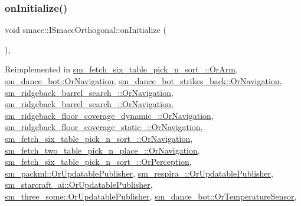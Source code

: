\subsubsection{\texorpdfstring{on\+Initialize()}{onInitialize()}}
{\footnotesize\ttfamily void smacc\+::\+I\+Smacc\+Orthogonal\+::on\+Initialize (\begin{DoxyParamCaption}{ }\end{DoxyParamCaption})\hspace{0.3cm}{\ttfamily [protected]}, {\ttfamily [virtual]}}



Reimplemented in \hyperlink{classsm__fetch__six__table__pick__n__sort__1_1_1OrArm_a0cce02f6b7599e602310347cad5c3729}{sm\+\_\+fetch\+\_\+six\+\_\+table\+\_\+pick\+\_\+n\+\_\+sort\+\_\+::\+Or\+Arm}, \hyperlink{classsm__dance__bot_1_1OrNavigation_a9f87c78f5af67024c9eda25097a135ac}{sm\+\_\+dance\+\_\+bot\+::\+Or\+Navigation}, \hyperlink{classsm__dance__bot__strikes__back_1_1OrNavigation_a458a0c5fed04b9906c6943f1e7ac5bf0}{sm\+\_\+dance\+\_\+bot\+\_\+strikes\+\_\+back\+::\+Or\+Navigation}, \hyperlink{classsm__ridgeback__barrel__search__1_1_1OrNavigation_ac144dc365f1d7708dfeace36b8734885}{sm\+\_\+ridgeback\+\_\+barrel\+\_\+search\+\_\+::\+Or\+Navigation}, \hyperlink{classsm__ridgeback__barrel__search__2_1_1OrNavigation_aee279dd334bda539b0a2b614ec32b95f}{sm\+\_\+ridgeback\+\_\+barrel\+\_\+search\+\_\+::\+Or\+Navigation}, \hyperlink{classsm__ridgeback__floor__coverage__dynamic__1_1_1OrNavigation_a4d090d426655e16dc668f48699d0f9c9}{sm\+\_\+ridgeback\+\_\+floor\+\_\+coverage\+\_\+dynamic\+\_\+::\+Or\+Navigation}, \hyperlink{classsm__ridgeback__floor__coverage__static__1_1_1OrNavigation_a1bb3bffac822d76afd68dfce4d93cadc}{sm\+\_\+ridgeback\+\_\+floor\+\_\+coverage\+\_\+static\+\_\+::\+Or\+Navigation}, \hyperlink{classsm__fetch__six__table__pick__n__sort__1_1_1OrNavigation_aa1c7c3022c02903431d88d7e34608ce1}{sm\+\_\+fetch\+\_\+six\+\_\+table\+\_\+pick\+\_\+n\+\_\+sort\+\_\+::\+Or\+Navigation}, \hyperlink{classsm__fetch__two__table__pick__n__place__1_1_1OrNavigation_aeac14b892e070c5117332111c20464f5}{sm\+\_\+fetch\+\_\+two\+\_\+table\+\_\+pick\+\_\+n\+\_\+place\+\_\+::\+Or\+Navigation}, \hyperlink{classsm__fetch__six__table__pick__n__sort__1_1_1OrPerception_acc62f973325e2ac14dd9df28fa20a685}{sm\+\_\+fetch\+\_\+six\+\_\+table\+\_\+pick\+\_\+n\+\_\+sort\+\_\+::\+Or\+Perception}, \hyperlink{classsm__packml_1_1OrUpdatablePublisher_a1689f8aac565881e3f65246b6d6ce6a2}{sm\+\_\+packml\+::\+Or\+Updatable\+Publisher}, \hyperlink{classsm__respira__1_1_1OrUpdatablePublisher_a0ae110d830e583571fc79b4daa9d424d}{sm\+\_\+respira\+\_\+::\+Or\+Updatable\+Publisher}, \hyperlink{classsm__starcraft__ai_1_1OrUpdatablePublisher_a349747bdf330b39d76871cd49d36d0eb}{sm\+\_\+starcraft\+\_\+ai\+::\+Or\+Updatable\+Publisher}, \hyperlink{classsm__three__some_1_1OrUpdatablePublisher_aecda3521d565c139c75080f12e7045e0}{sm\+\_\+three\+\_\+some\+::\+Or\+Updatable\+Publisher}, \hyperlink{classsm__dance__bot_1_1OrTemperatureSensor_a2e944e459a695774dcf7fdbd5ac93b01}{sm\+\_\+dance\+\_\+bot\+::\+Or\+Temperature\+Sensor}, 